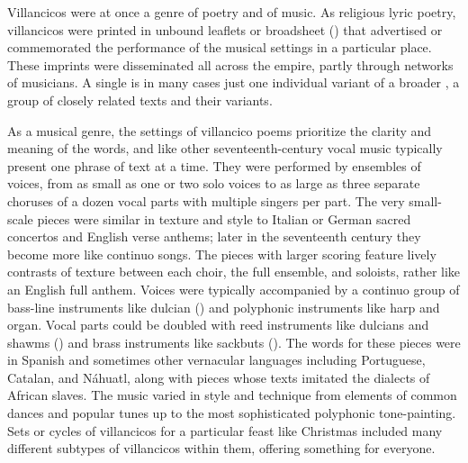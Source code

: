 
Villancicos were at once a genre of poetry and of music.
As religious lyric poetry, villancicos were printed in unbound leaflets or
broadsheet () that advertised or commemorated the
performance of the musical settings in a particular place.%
    \Autocite{LopezLorenzo:VC-Sevillano}
These imprints were disseminated all across the empire, partly through networks
of musicians.
A single  is in many cases just one individual variant of
a broader , a group of closely related texts and their
variants.


As a musical genre, the settings of villancico poems prioritize the clarity and
meaning of the words, and like other seventeenth-century vocal music typically
present one phrase of text at a time.
They were performed by ensembles of voices, from as small as one or two solo
voices to as large as three separate choruses of a dozen vocal parts with
multiple singers per part.
The very small-scale pieces were similar in texture and style to Italian or
German sacred concertos and English verse anthems; later in the seventeenth
century they become more like continuo songs.%
    \Autocite{Kendrick:SacredSongs}
The pieces with larger scoring feature lively contrasts of texture between each
choir, the full ensemble, and soloists, rather like an English full anthem.
Voices were typically accompanied by a continuo group of bass-line instruments
like dulcian () and polyphonic instruments like harp and organ.
Vocal parts could be doubled with reed instruments like dulcians and shawms
() and brass instruments like sackbuts ().
The words for these pieces were in Spanish and sometimes other vernacular
languages including Portuguese, Catalan, and Náhuatl, along with pieces whose
texts imitated the dialects of African slaves.
The music varied in style and technique from elements of common dances
and popular tunes up to the most sophisticated polyphonic tone-painting.
Sets or cycles of villancicos for a particular feast like Christmas included
many different subtypes of villancicos within them, offering something for
everyone.


